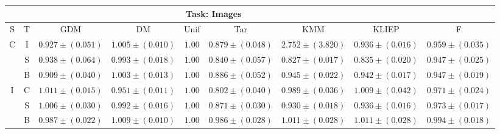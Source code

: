 \documentclass[twoside,11pt]{article}
\newcommand{\1}{\mat{1}}
\begin{document}
\begin{table}[t]
\vspace{.1in}
\centering
\begin{tabular}{ccccccccc}
 \hline
  \multicolumn{8}{c}{\small{Task: Images}} \\ \hline
\tiny{S} & \tiny{T} & \tiny{GDM} & \tiny{DM} & \tiny{Unif} & \tiny{Tar} & \tiny{KMM} & \tiny{KLIEP} & \tiny{F} \\  \hline
\multirow{3}{*}{ \tiny{C}} & \tiny{I} & $\mathbf{\scriptscriptstyle{ 0.927
    \pm ( 0.051 )}}$ & $\scriptscriptstyle{ 1.005   \pm ( 0.010 )}$ & $\scriptscriptstyle{1.00}$& $\scriptscriptstyle{ 0.879   \pm ( 0.048 )}$ & $\scriptscriptstyle{ 2.752   \pm ( 3.820 )}$ & $\scriptscriptstyle{ 0.936   \pm ( 0.016 )}$ & $\scriptscriptstyle{ 0.959   \pm ( 0.035 )}$\\
& \tiny{S} & $\scriptscriptstyle{ 0.938   \pm ( 0.064 )}$ & $\scriptscriptstyle{ 0.993   \pm ( 0.018 )}$ & $\scriptscriptstyle{1.00}$&$\scriptscriptstyle{ 0.840   \pm ( 0.057 )}$ & $\mathbf{\scriptscriptstyle{ 0.827   \pm ( 0.017 )}}$ & $\scriptscriptstyle{ 0.835   \pm ( 0.020 )}$ & $\scriptscriptstyle{ 0.947   \pm ( 0.025 )}$\\
& \tiny{B} & $\mathbf{\scriptscriptstyle{ 0.909   \pm ( 0.040 )}}$ & $\scriptscriptstyle{ 1.003   \pm ( 0.013 )}$ & $\scriptscriptstyle{1.00}$&$\scriptscriptstyle{ 0.886   \pm ( 0.052 )}$ & $\scriptscriptstyle{ 0.945   \pm ( 0.022 )}$ & $\scriptscriptstyle{ 0.942   \pm ( 0.017 )}$ & $\scriptscriptstyle{ 0.947   \pm ( 0.019 )}$\\
\hline
 \multirow{3}{*}{ \tiny{I}} & \tiny{C} & $\scriptscriptstyle{ 1.011   \pm
   ( 0.015 )}$ & $\mathbf{\scriptscriptstyle{ 0.951   \pm ( 0.011 )}}$ &
 $\scriptscriptstyle{1.00}$& $\scriptscriptstyle{ 0.802   \pm ( 0.040 )}$ & $\scriptscriptstyle{ 0.989   \pm ( 0.036 )}$ & $\scriptscriptstyle{ 1.009   \pm ( 0.042 )}$ & $\scriptscriptstyle{ 0.971   \pm ( 0.024 )}$\\
& \tiny{S} & $\scriptscriptstyle{ 1.006   \pm ( 0.030 )}$ & $\scriptscriptstyle{
  0.992   \pm ( 0.016 )}$ & $\scriptscriptstyle{1.00}$& $\scriptscriptstyle{ 0.871   \pm ( 0.030 )}$ & $\mathbf{\scriptscriptstyle{ 0.930   \pm ( 0.018 )}}$ & $\scriptscriptstyle{ 0.936   \pm ( 0.016 )}$ & $\scriptscriptstyle{ 0.973   \pm ( 0.017 )}$\\
& \tiny{B} & $\mathbf{\scriptscriptstyle{ 0.987   \pm ( 0.022 )}}$ &
$\scriptscriptstyle{ 1.009   \pm ( 0.010 )}$ & $\scriptscriptstyle{1.00}$& $\scriptscriptstyle{ 0.986   \pm ( 0.028 )}$ & $\scriptscriptstyle{ 1.011   \pm ( 0.028 )}$ & $\scriptscriptstyle{ 1.011   \pm ( 0.028 )}$ & $\scriptscriptstyle{ 0.994   \pm ( 0.018 )}$\\

\end{tabular}
\end{table}
\end{document}
